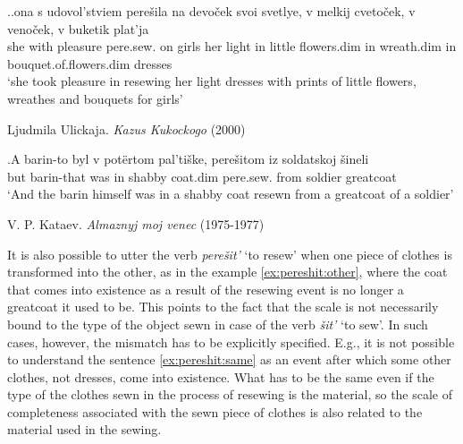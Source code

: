 \ex.\label{ex:pereshit}\ag.\label{ex:pereshit:same}ona s udovol'stviem pere\v{s}ila na devo\v{c}ek svoi svetlye, v melkij cveto\v{c}ek, v veno\v{c}ek, v buketik plat'ja\\
she with pleasure pere.sew. on girls her light in little flowers.dim in wreath.dim in bouquet.of.flowers.dim dresses\\
\vspace{0.5em}
`she took pleasure in resewing her light dresses with prints of little flowers, wreathes and bouquets for girls'\\
\vspace{-0.5em}
\begin{flushright}
Ljudmila Ulickaja. \textit{Kazus Kukockogo} (2000)
\end{flushright}
\bg.\label{ex:pereshit:other}A barin-to byl v pot\"{e}rtom pal'ti\v{s}ke, pere\v{s}itom iz soldatskoj \v{s}ineli\\
but barin-that was in shabby coat.dim pere.sew. from soldier greatcoat\\
\vspace{0.5em}
`And the barin himself was in a shabby coat resewn from a greatcoat of a soldier'\\
\vspace{-0.5em}
\begin{flushright}
V. P. Kataev. \textit{Almaznyj moj venec} (1975-1977)
\end{flushright}

It is also possible to utter the verb \textit{pere\v{s}it'} `to resew' when one piece of clothes is transformed into the other, as in the example \ref{ex:pereshit:other}, where the coat that comes into existence as a result of the resewing event is no longer a greatcoat it used to be. This points to the fact that the scale is not necessarily bound to the type of the object sewn in case of the verb \textit{\v{s}it'} `to sew'. In such cases, however, the mismatch has to be explicitly specified. E.g., it is not possible to understand the sentence \ref{ex:pereshit:same} as an event after which some other clothes, not dresses, come into existence. What has to be the same even if the type of the clothes sewn in the process of resewing is the material, so the scale of completeness associated with the sewn piece of clothes is also related to the material used in the sewing.


